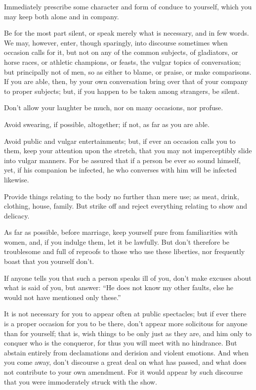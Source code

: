 Immediately prescribe some character and form of conduce to yourself, which you
may keep both alone and in company.

Be for  the most part  silent, or  speak merely what  is necessary, and  in few
words. We may, however, enter,  though sparingly, into discourse sometimes when
occasion calls for  it, but not on  any of the common  subjects, of gladiators,
or  horse  races, or  athletic  champions,  or  feasts,  the vulgar  topics  of
conversation; but principally not of men, so  as either to blame, or praise, or
make comparisons.  If you are able,  then, by your own  conversation bring over
that of your company  to proper subjects; but, if you happen  to be taken among
strangers, be silent.

Don't allow your laughter be much, nor on many occasions, nor profuse.

Avoid swearing, if possible, altogether; if not, as far as you are able.

Avoid public and  vulgar entertainments; but, if ever an  occasion calls you to
them, keep  your attention  upon the  stretch, that  you may  not imperceptibly
slide into  vulgar manners. For be  assured that if  a person be ever  so sound
himself, yet, if his  companion be infected, he who converses  with him will be
infected likewise.

Provide things relating to  the body no further than mere  use; as meat, drink,
clothing, house, family. But strike off  and reject everything relating to show
and delicacy.

As far as possible, before marriage, keep yourself pure from familiarities with
women, and,  if you indulge  them, let it be  lawfully. But don't  therefore be
troublesome  and  full of  reproofs  to  those  who  use these  liberties,  nor
frequently boast that you yourself don't.

If anyone tells  you that such a  person speaks ill of you,  don't make excuses
about what is said of you, but answer: ``He does not know my other faults, else
he would not have mentioned only these.''

It is not necessary  for you to appear often at public  spectacles; but if ever
there is a  proper occasion for you  to be there, don't  appear more solicitous
for anyone than for yourself; that is, wish things to be only just as they are,
and him only  to conquer who is the  conqueror, for thus you will  meet with no
hindrance.  But abstain  entirely from  declamations and  derision and  violent
emotions. And  when you  come away, don't  discourse a great  deal on  what has
passed, and what does not contribute to your own amendment. For it would appear
by such discourse that you were immoderately struck with the show.

